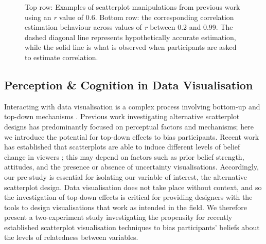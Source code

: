 \documentclass[sigconf]{acmart}
\begin{document}
\begin{figure}


\caption{\label{fig-previous-manipulations}Top row: Examples of
scatterplot manipulations from previous work using an \textit{r} value
of 0.6. Bottom row: the corresponding correlation estimation behaviour
across values of \textit{r} between 0.2 and 0.99. The dashed diagonal
line represents hypothetically accurate estimation, while the solid line
is what is observed when participants are asked to estimate
correlation.}

\end{figure}%

\subsection{Perception \& Cognition in Data
Visualisation}\label{sec-perception-cognition}

Interacting with data visualisation is a complex process involving
bottom-up and top-down mechanisms
\citep{shah_2011, franconeri_2021, xiong_2022}. Previous work
investigating alternative scatterplot designs has predominantly focused
on perceptual factors and mechanisms; here we introduce the potential
for top-down effects to bias participants. Recent work has established
that scatterplots are able to induce different levels of belief change
in viewers \citep{karduni_2020, markant_2023}; this may depend on
factors such as prior belief strength, attitudes, and the presence or
absence of uncertainty visualisations. Accordingly, our pre-study is
essential for isolating our variable of interest, the alternative
scatterplot design. Data visualisation does not take place without
context, and so the investigation of top-down effects is critical for
providing designers with the tools to design visualisations that work as
intended in the field. We therefore present a two-experiment study
investigating the propensity for recently established scatterplot
visualisation techniques to bias participants' beliefs about the levels
of relatedness between variables.
\end{document}
